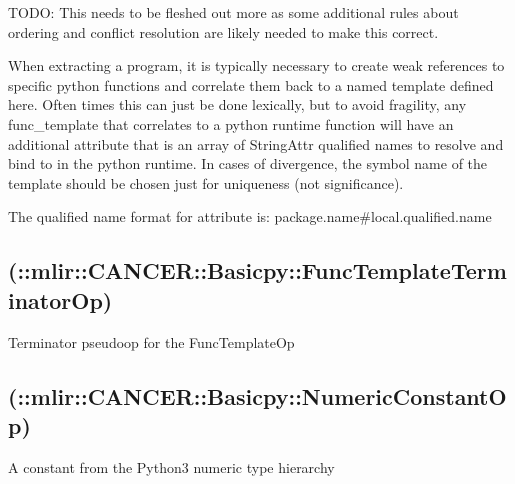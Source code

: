 \documentclass[letterpaper,10pt,english]{sphinxmanual}
\begin{document}
\sphinxAtStartPar
TODO: This needs to be fleshed out more as some additional rules about
ordering and conflict resolution are likely needed to make this correct.

\sphinxAtStartPar
When extracting a program, it is typically necessary to create weak
references to specific python functions and correlate them back to a
named template defined here. Often times this can just be done
lexically, but to avoid fragility, any func\_template that correlates to
a python runtime function will have an additional attribute 
that is an array of StringAttr qualified names to resolve and bind to in
the python runtime. In cases of divergence, the symbol name of the
template should be chosen just for uniqueness (not significance).

\sphinxAtStartPar
The qualified name format for  attribute is:
package.name\#local.qualified.name


\subsection{ (::mlir::CANCER::Basicpy::FuncTemplateTerminatorOp)}
\label{\detokenize{Basicpy/index:basicpy-func-template-terminator-mlir-cancer-basicpy-functemplateterminatorop}}
\sphinxAtStartPar
Terminator pseudo\sphinxhyphen{}op for the FuncTemplateOp


\subsection{ (::mlir::CANCER::Basicpy::NumericConstantOp)}
\label{\detokenize{Basicpy/index:basicpy-numeric-constant-mlir-cancer-basicpy-numericconstantop}}
\sphinxAtStartPar
A constant from the Python3 numeric type hierarchy
\end{document}
